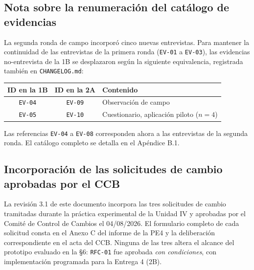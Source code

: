\documentclass[11pt,a4paper]{article}
\newcommand{\id}[1]{\texttt{\begingroup\hyphenpenalty=10000\relax#1\endgroup}}
\renewcommand{\id}[1]{\texttt{#1}}
\begin{document}
\subsection{Nota sobre la renumeración del catálogo de evidencias}

La segunda ronda de campo incorporó cinco nuevas entrevistas. Para mantener la continuidad de las
entrevistas de la primera ronda (\id{EV-01} a \id{EV-03}), las evidencias no-entrevista de la 1B se
desplazaron según la siguiente equivalencia, registrada también en \id{CHANGELOG.md}:

\begin{center}
\begin{tabular}{|c|c|l|}
\hline
\rowcolor{grisclaro}\textbf{ID en la 1B} & \textbf{ID en la 2A} & \textbf{Contenido} \\ \hline
\id{EV-04} & \id{EV-09} & Observación de campo \\ \hline
\id{EV-05} & \id{EV-10} & Cuestionario, aplicación piloto ($n=4$) \\ \hline
\end{tabular}
\end{center}

\vspace{0.3cm}
\noindent Las referencias \id{EV-04} a \id{EV-08} corresponden ahora a las entrevistas de la segunda
ronda. El catálogo completo se detalla en el Apéndice B.1.

\subsection{Incorporación de las solicitudes de cambio aprobadas por el CCB}
\label{sec:rfc}

La revisión 3.1 de este documento incorpora las tres solicitudes de cambio tramitadas durante la
práctica experimental de la Unidad IV y aprobadas por el Comité de Control de Cambios el
04/08/2026. El formulario completo de cada solicitud consta en el Anexo C del informe de la PE4 y
la deliberación correspondiente en el acta del CCB. Ninguna de las tres altera el alcance del
prototipo evaluado en la §6: \id{RFC-01} fue aprobada \emph{con condiciones}, con implementación
programada para la Entrega 4 (2B).
\end{document}
